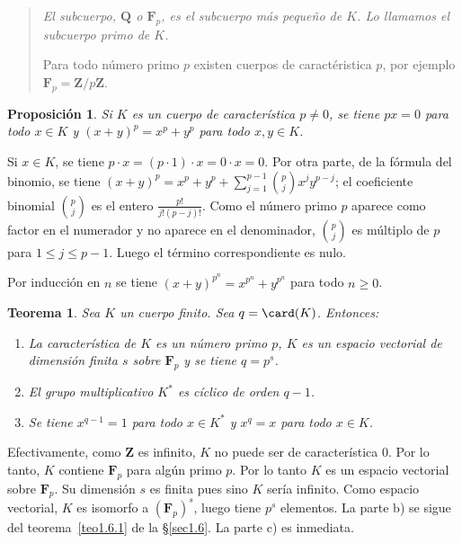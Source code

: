 \documentclass[bibtotoc,leqno,spanish]{amsbook}
\newcommand{\QQ}{\mathbf{Q}}
\newcommand{\ZZ}{\mathbf{Z}}
\newcommand{\FF}{\mathbf{F}}
\numberwithin{equation}{section}
\newenvironment{comm}%
	{\begin{quotation}\itshape}
	{\end{quotation}}
\theoremstyle{note}
\theoremstyle{note}
\newtheorem{theorem}{Teorema}
\newtheorem{proposition}{Proposici\'on}
\theoremstyle{rem}
\numberwithin{theorem}{section}
\numberwithin{proposition}{section}
\numberwithin{definition}{section}
\numberwithin{lemma}{section}
\numberwithin{corollary}{section}
\numberwithin{example}{section}
\numberwithin{footnote}{section}%
\begin{document}
\begin{comm}
El subcuerpo, $\QQ$ o $\FF_{p}$, es el subcuerpo m\'as
peque\~no de $K$. Lo llamamos el {\em subcuerpo primo} de $K$.

Para todo n\'umero primo $p$ existen cuerpos de caract\'eristica $p$,
por ejemplo $\FF_{p} = \ZZ/p\ZZ$.
\end{comm}

\begin{proposition}\label{prop1.7.1}
Si $K$ es un cuerpo de caracter\'istica $p\neq 0$, se tiene
$px = 0$ para todo $x\in K$ y $(x+y)^{p} = x^{p}+y^{p}$ para
todo $x, y\in K$.
\end{proposition}

Si $x\in K$, se tiene $p\cdot x = (p\cdot 1)\cdot x = 0\cdot x = 0$. Por otra parte,
de la f\'ormula del binomio, se tiene $(x+y)^{p} = x^{p}+y^{p}+\sum_{j=1}^{p-1}\binom{p}{j}x^{j}y^{p-j}$;
el coeficiente binomial $\binom{p}{j}$ es el entero $\frac{p!}{j!(p-j)!}$. Como el n\'umero primo
$p$ aparece como factor en el numerador y no aparece en el denominador, $\binom{p}{j}$ es m\'ultiplo
de $p$ para $1\leq j\leq p-1$. Luego el t\'ermino correspondiente es nulo.

Por inducci\'on en $n$ se tiene $(x+y)^{p^{n}}=x^{p^{n}}+y^{p^{n}}$ para todo $n\geq 0$.

\begin{theorem}\label{teo1.7.1}
Sea $K$ un cuerpo finito. Sea $q = \card(K)$. Entonces:
\begin{enumerate}%
\item[a)] La caracter\'istica de $K$ es un n\'umero primo $p$, $K$ es un espacio vectorial de
dimensi\'on finita $s$ sobre $\FF_{p}$ y se tiene $q = p^{s}$.
\item[b)] El grupo multiplicativo $K^{*}$ es c\'iclico de orden $q-1$.
\item[c)] Se tiene $x^{q-1} = 1$ para todo $x\in K^{*}$ y $x^{q} = x$ para todo $x\in K$.
\end{enumerate}
\end{theorem}

Efectivamente, como $\ZZ$ es infinito, $K$ no puede ser de caracter\'istica $0$. Por lo tanto,
$K$ contiene $\FF_{p}$ para alg\'un primo $p$. Por lo tanto $K$ es un espacio vectorial sobre
$\FF_{p}$. Su dimensi\'on $s$ es finita pues sino $K$ ser\'ia infinito. Como espacio vectorial,
$K$ es isomorfo a $(\FF_{p})^{s}$, luego tiene $p^{s}$ elementos. La parte b) se sigue del
teorema~\ref{teo1.6.1} de la \S\ref{sec1.6}. La parte c) es inmediata.
\end{document}
